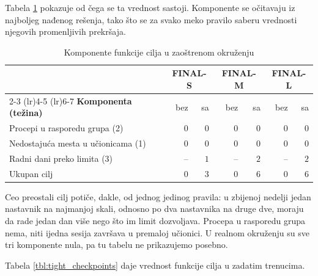 \documentclass[12pt,oneside]{memoir}
\begin{document}
Tabela \ref{tbl:tight_komponente} pokazuje od čega se ta vrednost
sastoji. Komponente se očitavaju iz najboljeg nađenog rešenja, tako što
se za svako meko pravilo saberu vrednosti njegovih promenljivih
prekršaja.

\begin{table}[ht]
\centering
\caption{Komponente funkcije cilja u zaoštrenom okruženju}
\label{tbl:tight_komponente}
\begin{tabular}{lrrrrrr}
\toprule
& \multicolumn{2}{c}{\textbf{FINAL-S}}
& \multicolumn{2}{c}{\textbf{FINAL-M}}
& \multicolumn{2}{c}{\textbf{FINAL-L}} \\
\cmidrule(lr){2-3} \cmidrule(lr){4-5} \cmidrule(lr){6-7}
\textbf{Komponenta (težina)} & bez & sa & bez & sa & bez & sa \\
\midrule
Procepi u rasporedu grupa (2)      & $0$ & $0$ & $0$ & $0$ & $0$ & $0$ \\
Nedostajuća mesta u učionicama (1) & $0$ & $0$ & $0$ & $0$ & $0$ & $0$ \\
Radni dani preko limita (3)        & --  & $1$ & --  & $2$ & --  & $2$ \\
\midrule
Ukupan cilj                        & $0$ & $3$ & $0$ & $6$ & $0$ & $6$ \\
\bottomrule
\end{tabular}
\end{table}

Ceo preostali cilj potiče, dakle, od jednog jedinog pravila: u zbijenoj
nedelji jedan nastavnik na najmanjoj skali, odnosno po dva nastavnika na
druge dve, moraju da rade jedan dan više nego što im limit dozvoljava.
Procepa u rasporedu grupa nema, niti ijedna sesija završava u premaloj
učionici. U realnom okruženju su sve tri komponente nula, pa tu tabelu
ne prikazujemo posebno.

Tabela \ref{tbl:tight_checkpoints} daje vrednost funkcije cilja u zadatim
trenucima.
\end{document}
